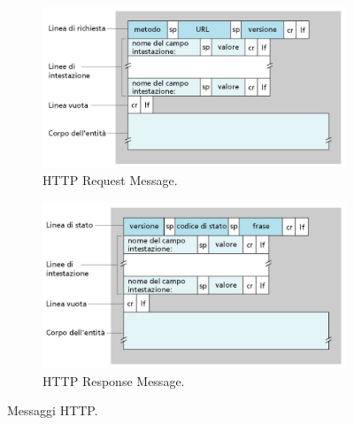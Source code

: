 \documentclass[11pt, italian, openany]{book}
\begin{document}
\begin{sloppypar}
\begin{figure}[h!]
	\begin{subfigure}[t]{0.49 \linewidth} \centering
		\includegraphics[scale=0.25]{images/http-request.png}
		\caption{HTTP Request Message.}
	\end{subfigure}
	\begin{subfigure}[t]{0.49 \linewidth} \centering
		\includegraphics[scale=0.25]{images/http-response.png}
		\caption{HTTP Response Message.}
	\end{subfigure}
	\caption{Messaggi HTTP.}
	\label{fig:messaggi-http}
\end{figure}

\pagebreak


\end{sloppypar}
\end{document}
